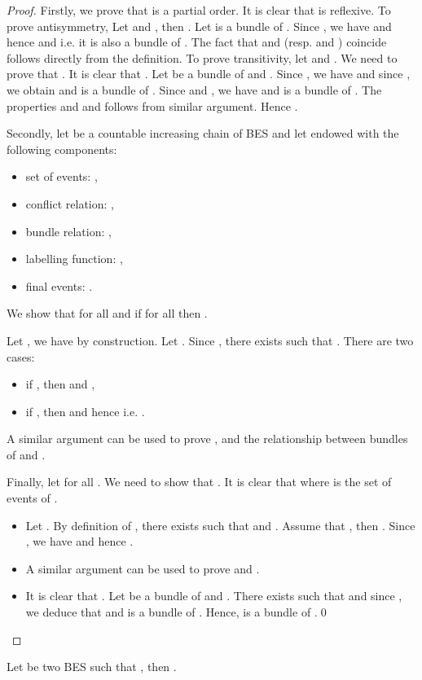 \documentclass{llncs}
\newcommand{\<}{\langle}
\renewcommand{\>}{\rangle}
\begin{document}
\begin{proof}
Firstly, we prove that  is a partial order. It is clear that  is reflexive. To prove antisymmetry, Let  and , then . Let  is a bundle of . Since , we have  and hence  and  i.e. it is also a bundle of . The fact that  and  (resp.  and ) coincide follows directly from the definition. To prove transitivity, let  and . We need to prove that . It is clear that . Let   be a bundle of  and . Since , we have  and since , we obtain  and  is a bundle of . Since  and , we have  and  is a bundle of . The properties  and  and  follows from similar argument. Hence .

Secondly, let  be a countable increasing chain of BES and let  endowed with the following components:
\begin{itemize}
\item set of events: ,
\item conflict relation: ,
\item bundle relation: ,
\item labelling function: ,
\item final events: .
\end{itemize}
We show that  for all  and if  for all  then .

Let , we have  by construction. Let . Since , there exists  such that . There are two cases:
\begin{itemize}
\item if , then  and ,
\item if , then  and hence  i.e. .
\end{itemize}
A similar argument can be used to prove ,  and the relationship between bundles of  and .

Finally, let  for all . We need to show that . It is clear that  where  is the set of events of . 
\begin{itemize}
\item Let . By definition of , there exists  such that  and . Assume that , then . Since , we have  and hence . 
\item A similar argument can be used to prove  and .
\item It is clear that . Let  be a bundle of  and . There exists  such that  and since , we deduce that  and  is a bundle of . Hence,  is a bundle of .\qed
\end{itemize}
\end{proof}

\begin{proposition}\label{pro:prefix-trace}
Let  be two BES such that , then .
\end{proposition}
\end{document}
